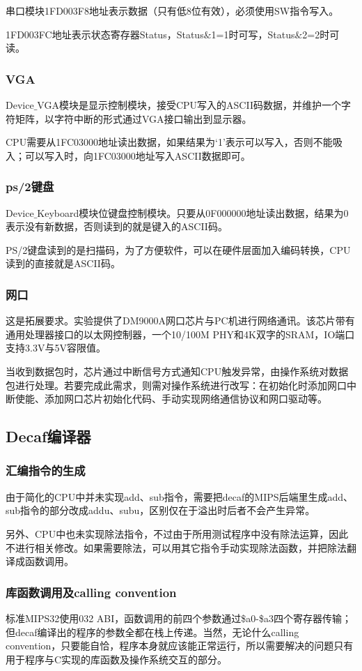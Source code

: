 串口模块1FD003F8地址表示数据（只有低8位有效），必须使用SW指令写入。

1FD003FC地址表示状态寄存器Status，Status$\&$1=1时可写，Status$\&$2=2时可读。
\subsubsection{VGA}
Device$\_$VGA模块是显示控制模块，接受CPU写入的ASCII码数据，并维护一个字符矩阵，以字符中断的形式通过VGA接口输出到显示器。

CPU需要从1FC03000地址读出数据，如果结果为‘1’表示可以写入，否则不能吸入；可以写入时，向1FC03000地址写入ASCII数据即可。
\subsubsection{ps/2键盘}
Device$\_$Keyboard模块位键盘控制模块。只要从0F000000地址读出数据，结果为0表示没有新数据，否则读到的就是键入的ASCII码。

PS/2键盘读到的是扫描码，为了方便软件，可以在硬件层面加入编码转换，CPU读到的直接就是ASCII码。
\subsubsection{网口}
这是拓展要求。实验提供了DM9000A网口芯片与PC机进行网络通讯。该芯片带有通用处理器接口的以太网控制器，一个10/100M PHY和4K双字的SRAM，IO端口支持3.3V与5V容限值。

当收到数据包时，芯片通过中断信号方式通知CPU触发异常，由操作系统对数据包进行处理。若要完成此需求，则需对操作系统进行改写：在初始化时添加网口中断使能、添加网口芯片初始化代码、手动实现网络通信协议和网口驱动等。
\subsection{Decaf编译器}
\subsubsection{汇编指令的生成}
由于简化的CPU中并未实现add、sub指令，需要把decaf的MIPS后端里生成add、sub指令的部分改成addu、subu，区别仅在于溢出时后者不会产生异常。

另外、CPU中也未实现除法指令，不过由于所用测试程序中没有除法运算，因此不进行相关修改。如果需要除法，可以用其它指令手动实现除法函数，并把除法翻译成函数调用。
\subsubsection{库函数调用及calling convention}
标准MIPS32使用032 ABI，函数调用的前四个参数通过\$a0-\$a3四个寄存器传输；但decaf编译出的程序的参数全都在栈上传递。当然，无论什么calling convention，只要能自恰，程序本身就应该能正常运行，所以需要解决的问题只有用于程序与C实现的库函数及操作系统交互的部分。

